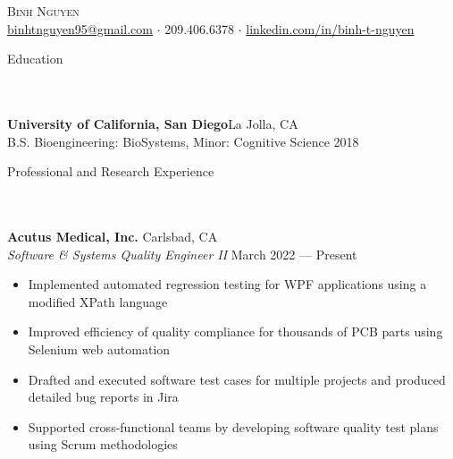 \documentclass{article}
\newcommand{\lineunder} {
    \vspace*{-8pt} \\
    \hspace*{-18pt} \hrulefill \\
}
\newcommand{\header} [1] {
    {\hspace*{-18pt}\vspace*{6pt} \Large{#1} }
    \vspace*{-6pt} 
    \lineunder
}
\begin{document}

\vspace*{-50pt}


\begin{center}
	{\Huge \scshape {Binh Nguyen}}\\
	\vspace{2mm}
	\href{mailto:binhtnguyen95@gmail.com}{binhtnguyen95@gmail.com} $\cdot$ 
	209.406.6378 $\cdot$ 
	\href{https://www.linkedin.com/in/binh-t-nguyen}{linkedin.com/in/binh-t-nguyen} 
\end{center}

\header{Education}
\textbf{University of California, San Diego}\hfill La Jolla, CA\\
B.S. Bioengineering: BioSystems, Minor: Cognitive Science \hfill 2018\\
\vspace{7mm}

\header{Professional and Research Experience}

\textbf{Acutus Medical, Inc.} \hfill Carlsbad, CA\\
\textit{Software \& Systems Quality Engineer II} \hfill March 2022 --- Present\\
\vspace{-2mm}
\begin{itemize} \itemsep 0.05pt
	\item Implemented automated regression testing for WPF applications using a modified XPath language
	\item Improved efficiency of quality compliance for thousands of PCB parts using Selenium web automation
	\item Drafted and executed software test cases for multiple projects and produced detailed bug reports in Jira
	\item Supported cross-functional teams by developing software quality test plans using Scrum methodologies
\end{itemize}
\end{document}
